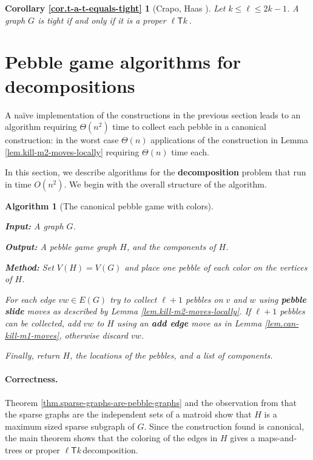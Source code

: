 \documentclass[11pt]{article}
\newcommand{\ellteekay}{\ensuremath{\ell{\mathsf T}k}\,}
\newtheorem{algorithm}[theorem]{Algorithm}
\newcommand{\reflem}[1]{Lemma \ref{lem.#1}}
\newcommand{\refthm}[1]{Theorem \ref{thm.#1}}
\newcommand{\refcor}[1]{Corollary \ref{cor.#1}}
\newcommand{\labelalg}[1]{\label{alg.#1}}
\newcommand{\restateenv}{ZZZ}
\newenvironment{restatecor}[1]{
  \renewcommand{\restateenv}{restate.#1}
  \newtheorem*{\restateenv}{\refcor{#1}}
  \begin{\restateenv}
}{\end{\restateenv}}
\begin{document}
	\begin{restatecor}{t-a-t-equals-tight}[Crapo, Haas \cite{haas:2002,Cr96}] 
		Let $k\le \ell\le 2k-1$. A graph $G$ is tight if and only if it is a proper \ellteekay.
	\end{restatecor}
	
	\section{Pebble game algorithms for decompositions}
	A naïve implementation of the constructions in the previous section leads to an 
	algorithm requiring $\Theta(n^2)$ time to collect each pebble in a canonical 
	construction: in the worst case $\Theta(n)$ applications of the construction 
	in \reflem{kill-m2-moves-locally} requiring $\Theta(n)$ time each.
	
	In this section, we describe algorithms for the {\bf decomposition} problem
	that run in time $O(n^2)$.  We begin with the overall structure of the algorithm.

	\begin{algorithm}
		[The canonical pebble game with colors]\labelalg{canonical-pebble-game}

		{\bf Input:} A graph $G$. 

		{\bf Output:} A pebble game graph $H$, and the components of $H$. 

		{\bf Method:} Set $V(H)=V(G)$ and place one pebble of each color on the vertices of $H$.

		For each edge $vw\in E(G)$ try to collect $\ell+1$ pebbles on $v$ and $w$ using {\bf pebble slide} moves as described by \reflem{kill-m2-moves-locally}. If $\ell+1$ pebbles can be collected, add $vw$ to $H$ using an {\bf add edge} move as in \reflem{can-kill-m1-moves}, otherwise discard $vw$. 

		Finally, return $H$, the locations of the pebbles, and a list of components. 
	\end{algorithm}

	\paragraph{Correctness.}  \refthm{sparse-graphs-are-pebble-graphs} and the
	observation from \cite{whiteley:matroids} that the sparse graphs are the independent
	sets of a matroid show that $H$ is a maximum sized sparse subgraph of $G$.  Since
	the construction found is canonical, the main theorem shows that the coloring of 
	the edges in $H$ gives a maps-and-trees or proper \ellteekay decomposition.
\end{document}
